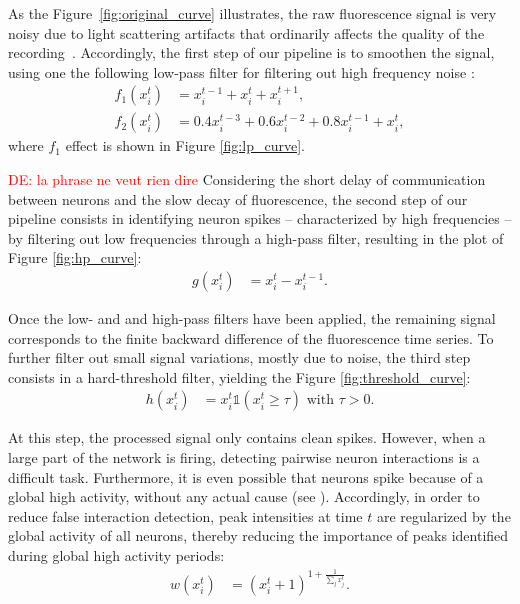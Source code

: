 \documentclass[wcp]{jmlr}
\begin{document}
As the Figure~\ref{fig:original_curve} illustrates, the raw
fluorescence signal is very noisy due to light scattering artifacts that
ordinarily affects the quality of the recording~\citep{lichtman2011big}.
Accordingly, the first step of our pipeline is to smoothen the signal, using
one the following low-pass filter for filtering out high frequency noise :
\begin{align}
f_1(x^t_i) &= x^{t-1}_i + x^t_i + x^{t+1}_i \label{eq:symetric-median}, \\
f_2(x^t_i) &= 0.4 x^{t-3}_i + 0.6 x^{t-2}_i + 0.8 x^{t-1}_i + x_i^t,
\label{eq:weighted-asymetric-median}
\end{align}
where $f_1$ effect is shown in Figure \ref{fig:lp_curve}.

\textcolor{red}{DE: la phrase ne veut rien dire}
Considering the short delay of communication between neurons and the slow
decay of fluorescence, the second step of our pipeline consists in identifying
neuron spikes -- characterized by high frequencies -- by filtering out low
frequencies through a high-pass filter, resulting in the plot of
Figure \ref{fig:hp_curve}:
\begin{align}
g(x^{t}_{i}) &= x^{t}_i - x^{t-1}_i. \label{eq:high-pass-filter}
\end{align}

Once the low- and and high-pass filters have been applied, the remaining signal
corresponds to the finite backward difference of the fluorescence time series.
To further filter out small signal variations, mostly due to noise, the third
step consists in a  hard-threshold filter, yielding the Figure
\ref{fig:threshold_curve}:
\begin{align}
h(x^{t}_i) &= x^{t}_i \mathbb{1}(x^{t}_i \geq \tau) \text{ with } \tau > 0.
\end{align}

At this step, the processed signal only contains clean spikes. However, when a
large part of the network is firing, detecting pairwise neuron interactions is
a difficult task. Furthermore, it is even possible that neurons spike because
of a global high activity, without any actual cause (see
\cite{stetter2012model}). Accordingly, in order to reduce false interaction
detection, peak intensities at time $t$ are regularized by the global activity
of all neurons, thereby reducing the importance of peaks identified during
global high activity periods:
\begin{align}
 w(x^{t}_i) &= (x^{t}_i + 1 )^{1 + \frac{1}{\sum_{j} x^{t}_j}}.
\end{align}
\end{document}
